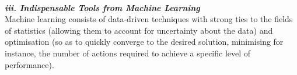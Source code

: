 \noindent \textbf{\textit{\\iii. Indispensable Tools from Machine Learning}}\\
%
%
Machine learning consists of data-driven techniques with strong ties to the fields of statistics (allowing them to account for uncertainty about the data) and optimisation (so as to quickly converge to the desired solution, minimising for instance, the number of actions required to achieve a specific level of performance).   	



